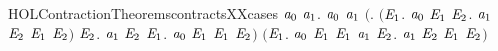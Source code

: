 \begin{SaveVerbatim}{HOLContractionTheoremscontractsXXcases}
\HOLTokenTurnstile{} \HOLSymConst{\HOLTokenForall{}}\ensuremath{\HOLBoundVar{a}\sb{\mathrm{0}}} \ensuremath{\HOLBoundVar{a}\sb{\mathrm{1}}}.
       \ensuremath{\HOLBoundVar{a}\sb{\mathrm{0}}}  \ensuremath{\HOLBoundVar{a}\sb{\mathrm{1}}} \HOLSymConst{\HOLTokenEquiv{}}
       \ensuremath{(}\HOLSymConst{\HOLTokenForall{}}.
            \ensuremath{(}\HOLSymConst{\HOLTokenForall{}}\ensuremath{\HOLBoundVar{E}\sb{\mathrm{1}}}.
                 \ensuremath{\HOLBoundVar{a}\sb{\mathrm{0}}} \HOLTokenTransBegin{} \HOLTokenTransEnd \ensuremath{\HOLBoundVar{E}\sb{\mathrm{1}}} \HOLSymConst{\HOLTokenImp{}}
                 \HOLSymConst{\HOLTokenExists{}}\ensuremath{\HOLBoundVar{E}\sb{\mathrm{2}}}. \ensuremath{\HOLBoundVar{a}\sb{\mathrm{1}}} \HOLTokenTransBegin{} \HOLTokenTransEnd \ensuremath{\HOLBoundVar{E}\sb{\mathrm{2}}} \HOLSymConst{\HOLTokenConj{}} \ensuremath{\HOLBoundVar{E}\sb{\mathrm{1}}}  \ensuremath{\HOLBoundVar{E}\sb{\mathrm{2}}}\ensuremath{)} \HOLSymConst{\HOLTokenConj{}}
            \HOLSymConst{\HOLTokenForall{}}\ensuremath{\HOLBoundVar{E}\sb{\mathrm{2}}}.
                \ensuremath{\HOLBoundVar{a}\sb{\mathrm{1}}} \HOLTokenTransBegin{} \HOLTokenTransEnd \ensuremath{\HOLBoundVar{E}\sb{\mathrm{2}}} \HOLSymConst{\HOLTokenImp{}}
                \HOLSymConst{\HOLTokenExists{}}\ensuremath{\HOLBoundVar{E}\sb{\mathrm{1}}}. \ensuremath{\HOLBoundVar{a}\sb{\mathrm{0}}} \HOLTokenWeakTransBegin{} \HOLTokenWeakTransEnd \ensuremath{\HOLBoundVar{E}\sb{\mathrm{1}}} \HOLSymConst{\HOLTokenConj{}}  \ensuremath{\HOLBoundVar{E}\sb{\mathrm{1}}} \ensuremath{\HOLBoundVar{E}\sb{\mathrm{2}}}\ensuremath{)} \HOLSymConst{\HOLTokenConj{}}
       \ensuremath{(}\HOLSymConst{\HOLTokenForall{}}\ensuremath{\HOLBoundVar{E}\sb{\mathrm{1}}}.
            \ensuremath{\HOLBoundVar{a}\sb{\mathrm{0}}} \HOLTokenTransBegin\HOLConst{\ensuremath{\tau}}\HOLTokenTransEnd \ensuremath{\HOLBoundVar{E}\sb{\mathrm{1}}} \HOLSymConst{\HOLTokenImp{}}
            \ensuremath{\HOLBoundVar{E}\sb{\mathrm{1}}}  \ensuremath{\HOLBoundVar{a}\sb{\mathrm{1}}} \HOLSymConst{\HOLTokenDisj{}} \HOLSymConst{\HOLTokenExists{}}\ensuremath{\HOLBoundVar{E}\sb{\mathrm{2}}}. \ensuremath{\HOLBoundVar{a}\sb{\mathrm{1}}} \HOLTokenTransBegin\HOLConst{\ensuremath{\tau}}\HOLTokenTransEnd \ensuremath{\HOLBoundVar{E}\sb{\mathrm{2}}} \HOLSymConst{\HOLTokenConj{}} \ensuremath{\HOLBoundVar{E}\sb{\mathrm{1}}}  \ensuremath{\HOLBoundVar{E}\sb{\mathrm{2}}}\ensuremath{)} \HOLSymConst{\HOLTokenConj{}}

\end{SaveVerbatim}
